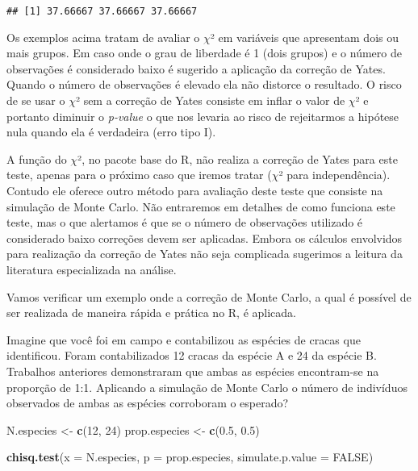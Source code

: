 \documentclass[titlepage, oneside, openany, a4paper]{book}
\newenvironment{Shaded}{\begin{snugshade}}{\end{snugshade}}
\newcommand{\DataTypeTok}[1]{\textcolor[rgb]{0.13,0.29,0.53}{#1}}
\newcommand{\DecValTok}[1]{\textcolor[rgb]{0.00,0.00,0.81}{#1}}
\newcommand{\FloatTok}[1]{\textcolor[rgb]{0.00,0.00,0.81}{#1}}
\newcommand{\KeywordTok}[1]{\textcolor[rgb]{0.13,0.29,0.53}{\textbf{#1}}}
\newcommand{\NormalTok}[1]{#1}
\newcommand{\OperatorTok}[1]{\textcolor[rgb]{0.81,0.36,0.00}{\textbf{#1}}}
\newcommand{\OtherTok}[1]{\textcolor[rgb]{0.56,0.35,0.01}{#1}}
\newcommand{\StringTok}[1]{\textcolor[rgb]{0.31,0.60,0.02}{#1}}
\begin{document}
\begin{Shaded}
\end{Shaded}

\begin{verbatim}
## [1] 37.66667 37.66667 37.66667
\end{verbatim}

Os exemplos acima tratam de avaliar o \(\chi\)² em variáveis que apresentam dois ou mais grupos. Em caso onde o grau de liberdade é 1 (dois grupos) e o número de observações é considerado baixo é sugerido a aplicação da correção de Yates. Quando o número de observações é elevado ela não distorce o resultado. O risco de se usar o \(\chi\)² sem a correção de Yates consiste em inflar o valor de \(\chi\)² e portanto diminuir o \emph{p-value} o que nos levaria ao risco de rejeitarmos a hipótese nula quando ela é verdadeira (erro tipo I).

A função do \(\chi\)², no pacote base do R, não realiza a correção de Yates para este teste, apenas para o próximo caso que iremos tratar (\(\chi\)² para independência). Contudo ele oferece outro método para avaliação deste teste que consiste na simulação de Monte Carlo. Não entraremos em detalhes de como funciona este teste, mas o que alertamos é que se o número de observações utilizado é considerado baixo correções devem ser aplicadas. Embora os cálculos envolvidos para realização da correção de Yates não seja complicada sugerimos a leitura da literatura especializada na análise.

Vamos verificar um exemplo onde a correção de Monte Carlo, a qual é possível de ser realizada de maneira rápida e prática no R, é aplicada.

Imagine que você foi em campo e contabilizou as espécies de cracas que identificou. Foram contabilizados 12 cracas da espécie A e 24 da espécie B. Trabalhos anteriores demonstraram que ambas as espécies encontram-se na proporção de 1:1. Aplicando a simulação de Monte Carlo o número de indivíduos observados de ambas as espécies corroboram o esperado?

\begin{Shaded}
\begin{Highlighting}[]
\NormalTok{N.especies <-}\StringTok{ }\KeywordTok{c}\NormalTok{(}\DecValTok{12}\NormalTok{, }\DecValTok{24}\NormalTok{)}
\NormalTok{prop.especies <-}\StringTok{ }\KeywordTok{c}\NormalTok{(}\FloatTok{0.5}\NormalTok{, }\FloatTok{0.5}\NormalTok{)}

\KeywordTok{chisq.test}\NormalTok{(}\DataTypeTok{x =}\NormalTok{ N.especies, }\DataTypeTok{p =}\NormalTok{ prop.especies, }\DataTypeTok{simulate.p.value =} \OtherTok{FALSE}\NormalTok{)}
\end{Highlighting}
\end{Shaded}
\end{document}
